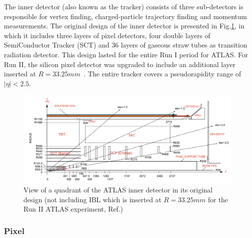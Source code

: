 \label{sec:detector-id}

The inner detector (also known as the tracker) consists of three sub-detectors is responsible for vertex finding, charged-particle trajectory finding and momentum measurements. The original design of the inner detector is presented in Fig.\ref{fig:detector-id}, in which it includes three layers of pixel detectors, four double layers of SemiConductor Tracker (SCT) and 36 layers of gaseous straw tubes as transition radiation detector. This design lasted for the entire Run I period for ATLAS. For Run II, the silicon pixel detector was upgraded to include an additional layer inserted at $R=33.25mm$~\cite{CERN-LHCC-2010-013}. The entire tracker covers a pseudorapidity range of $|\eta|<2.5$.


\begin{figure}[htpb!]
\begin{center}
  \includegraphics[width=0.9\linewidth]{figures/detector/ID}
\caption{View of a quadrant of the ATLAS inner detector in its original design (not including IBL which is inserted at $R=33.25mm$ for the Run II ATLAS experiment, Ref.\cite{SCTpaper})}
\label{fig:detector-id}
\end{center}
\end{figure}



\subsubsection{Pixel}


